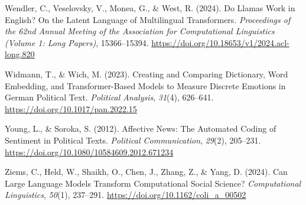 \documentclass[
  man,
  floatsintext,
  longtable,
  nolmodern,
  notxfonts,
  notimes,
  colorlinks=true,linkcolor=blue,citecolor=blue,urlcolor=blue]{apa7}
\newlength{\cslhangindent}
\newenvironment{CSLReferences}[2] %
 {\begin{list}{}{%
  \setlength{\itemindent}{0pt}
  \setlength{\leftmargin}{0pt}
  \setlength{\parsep}{0pt}
  \ifodd #1
   \setlength{\leftmargin}{\cslhangindent}
   \setlength{\itemindent}{-1\cslhangindent}
  \fi
  \setlength{\itemsep}{#2\baselineskip}}}
 {\end{list}}
\begin{document}
\begin{CSLReferences}{1}{0}
Wendler, C., Veselovsky, V., Monea, G., \& West, R. (2024). Do {Llamas
Work} in {English}? {On} the {Latent Language} of {Multilingual
Transformers}. \emph{Proceedings of the 62nd {Annual Meeting} of the
{Association} for {Computational Linguistics} ({Volume} 1: {Long
Papers})}, 15366--15394.
\url{https://doi.org/10.18653/v1/2024.acl-long.820}

Widmann, T., \& Wich, M. (2023). Creating and {Comparing Dictionary},
{Word Embedding}, and {Transformer-Based Models} to {Measure Discrete
Emotions} in {German Political Text}. \emph{Political Analysis},
\emph{31}(4), 626--641. \url{https://doi.org/10.1017/pan.2022.15}

Young, L., \& Soroka, S. (2012). Affective {News}: {The Automated
Coding} of {Sentiment} in {Political Texts}. \emph{Political
Communication}, \emph{29}(2), 205--231.
\url{https://doi.org/10.1080/10584609.2012.671234}

Ziems, C., Held, W., Shaikh, O., Chen, J., Zhang, Z., \& Yang, D.
(2024). Can {Large Language Models Transform Computational Social
Science}? \emph{Computational Linguistics}, \emph{50}(1), 237--291.
\url{https://doi.org/10.1162/coli_a_00502}

\end{CSLReferences}
\end{document}
